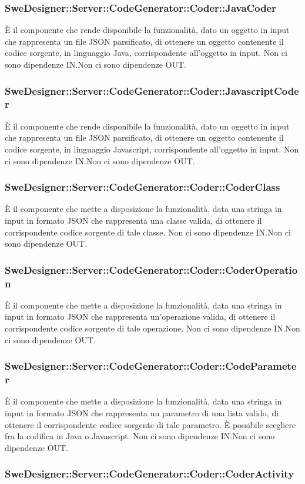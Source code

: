 \documentclass[../PianoDiQualifica.tex]{subfiles}
\begin{document}
		\subsubsection{SweDesigner::Server::CodeGenerator::Coder::JavaCoder}
		È il componente che rende disponibile la funzionalità, dato un oggetto in input che rappresenta un file JSON parsificato, di ottenere un oggetto contenente il codice sorgente, in linguaggio Java, corrispondente all'oggetto in input.
		Non ci sono dipendenze IN.Non ci sono dipendenze OUT.\subsubsection{SweDesigner::Server::CodeGenerator::Coder::JavascriptCoder}
		È il componente che rende disponibile la funzionalità, dato un oggetto in input che rappresenta un file JSON parsificato, di ottenere un oggetto contenente il codice sorgente, in linguaggio Javascript, corrispondente all'oggetto in input.
		Non ci sono dipendenze IN.Non ci sono dipendenze OUT.\subsubsection{SweDesigner::Server::CodeGenerator::Coder::CoderClass}
		È il componente che mette a disposizione la funzionalità, data una stringa in input in formato JSON che rappresenta una classe valida, di ottenere il corrispondente codice sorgente di tale classe.
		Non ci sono dipendenze IN.Non ci sono dipendenze OUT.\subsubsection{SweDesigner::Server::CodeGenerator::Coder::CoderOperation}
		È il componente che mette a disposizione la funzionalità, data una stringa in input in formato JSON che rappresenta un'operazione valida, di ottenere il corrispondente codice sorgente di tale operazione.
		Non ci sono dipendenze IN.Non ci sono dipendenze OUT.\subsubsection{SweDesigner::Server::CodeGenerator::Coder::CodeParameter}
		È il componente che mette a disposizione la funzionalità, data una stringa in input in formato JSON che rappresenta un parametro di una lista valido, di ottenere il corrispondente codice sorgente di tale parametro. È possibile scegliere fra la codifica in Java o Javascript.
		Non ci sono dipendenze IN.Non ci sono dipendenze OUT.\subsubsection{SweDesigner::Server::CodeGenerator::Coder::CoderActivity}
\end{document}
